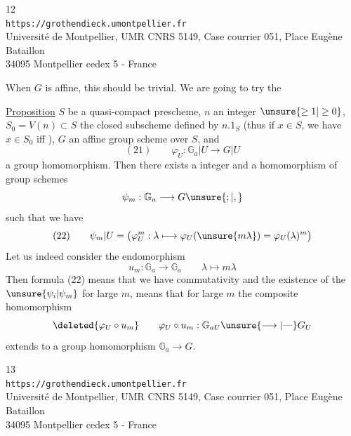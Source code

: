 \begin{center}
\small
12\\
\texttt{https://grothendieck.umontpellier.fr}\\
Université de Montpellier, UMR CNRS 5149, Case courrier 051, Place Eugène Bataillon\\
34095 Montpellier cedex 5 - France
\end{center}

When $G$ is affine, this should be trivial. We are going to try the

\uline{Proposition}  $S$ be a quasi-compact prescheme, $n$ an integer $\unsure{\geq1|\geq0}$,  $S_0=V(n)\subset S$ the closed subscheme defined by $n.1_S$ (thus if $x\in S$, we have $x\in S_0$ iff   ),  $G$ an affine group scheme  over $S$, and
\[
(21)\qquad\varphi_U:\mathbb G_a|U\longrightarrow G|U
\]
a group homomorphism.  Then there exists a  integer    and a homomorphism of group schemes
\[
\psi_m:\mathbb G_a\longrightarrow G\unsure{;|,}
\]
such that we have
\[
(22)\qquad\psi_m|U=\bigl(\varphi_U^m:\lambda\longmapsto\varphi_U(\unsure{m\lambda})=\varphi_U(\lambda)^m\bigr)
\]
Let us indeed consider the endomorphism
\[
u_m:\mathbb G_a\longrightarrow\mathbb G_a\qquad\lambda\longmapsto m\lambda
\]
Then formula (22) means that we have commutativity
and the existence of the $\unsure{\psi_i|\psi_m}$ for large $m$, means that for large $m$ the composite homomorphism
\[
\deleted{\varphi_U\circ u_m}\qquad\varphi_U\circ u_m:\mathbb G_{aU}\unsure{\longrightarrow|\text{---}}G_U
\]
extends to a group homomorphism $\mathbb G_a\longrightarrow G$.

\begin{center}
\small
13\\
\texttt{https://grothendieck.umontpellier.fr}\\
Université de Montpellier, UMR CNRS 5149, Case courrier 051, Place Eugène Bataillon\\
34095 Montpellier cedex 5 - France
\end{center}

